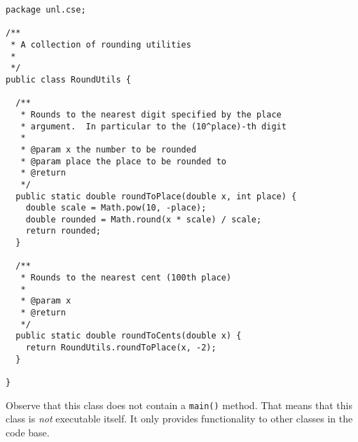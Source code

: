 \begin{verbatim}
package unl.cse;

/**
 * A collection of rounding utilities
 *
 */
public class RoundUtils {
  
  /**
   * Rounds to the nearest digit specified by the place
   * argument.  In particular to the (10^place)-th digit
   *
   * @param x the number to be rounded
   * @param place the place to be rounded to
   * @return
   */
  public static double roundToPlace(double x, int place) {
    double scale = Math.pow(10, -place);
    double rounded = Math.round(x * scale) / scale;
    return rounded;
  }

  /**
   * Rounds to the nearest cent (100th place)
   * 
   * @param x
   * @return
   */
  public static double roundToCents(double x) {
    return RoundUtils.roundToPlace(x, -2);
  }

}
\end{verbatim}

Observe that this class does not contain a \texttt{main()}
method.  That means that this class is \emph{not} executable 
itself.  It only provides functionality to other classes in the code
base.  







